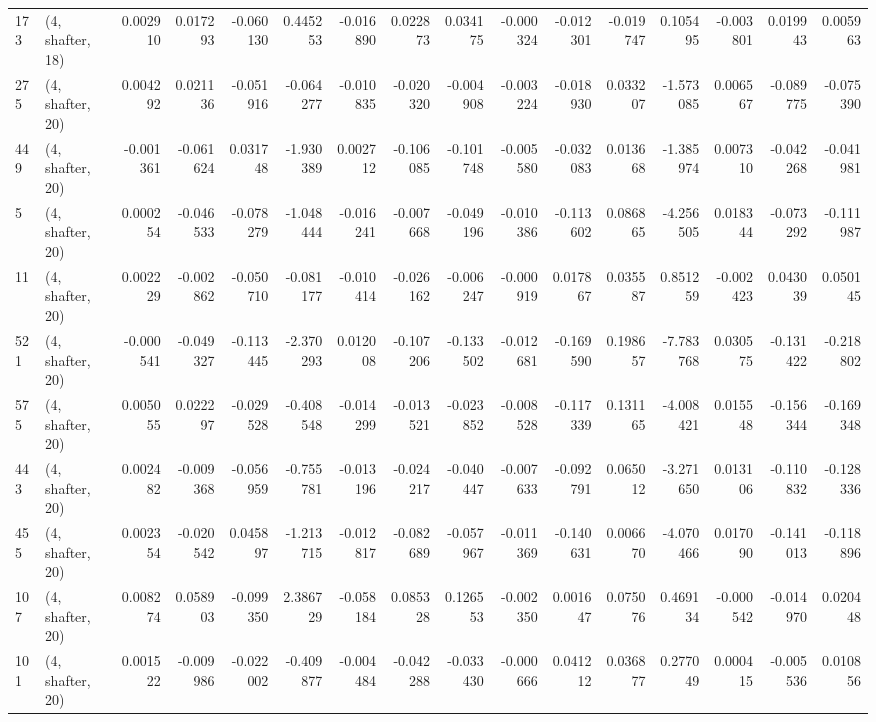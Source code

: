 \begin{tabular}{llrrrrrrrrrrrrrr}
173 &  (4, shafter, 18) &   0.002910 &  0.017293 & -0.060130 &    0.445253 & -0.016890 &   0.022873 &  0.034175 & -0.000324 & -0.012301 & -0.019747 &    0.105495 & -0.003801 &  0.019943 &  0.005963 \\
275 &  (4, shafter, 20) &   0.004292 &  0.021136 & -0.051916 &   -0.064277 & -0.010835 &  -0.020320 & -0.004908 & -0.003224 & -0.018930 &  0.033207 &   -1.573085 &  0.006567 & -0.089775 & -0.075390 \\
449 &  (4, shafter, 20) &  -0.001361 & -0.061624 &  0.031748 &   -1.930389 &  0.002712 &  -0.106085 & -0.101748 & -0.005580 & -0.032083 &  0.013668 &   -1.385974 &  0.007310 & -0.042268 & -0.041981 \\
5   &  (4, shafter, 20) &   0.000254 & -0.046533 & -0.078279 &   -1.048444 & -0.016241 &  -0.007668 & -0.049196 & -0.010386 & -0.113602 &  0.086865 &   -4.256505 &  0.018344 & -0.073292 & -0.111987 \\
11  &  (4, shafter, 20) &   0.002229 & -0.002862 & -0.050710 &   -0.081177 & -0.010414 &  -0.026162 & -0.006247 & -0.000919 &  0.017867 &  0.035587 &    0.851259 & -0.002423 &  0.043039 &  0.050145 \\
521 &  (4, shafter, 20) &  -0.000541 & -0.049327 & -0.113445 &   -2.370293 &  0.012008 &  -0.107206 & -0.133502 & -0.012681 & -0.169590 &  0.198657 &   -7.783768 &  0.030575 & -0.131422 & -0.218802 \\
575 &  (4, shafter, 20) &   0.005055 &  0.022297 & -0.029528 &   -0.408548 & -0.014299 &  -0.013521 & -0.023852 & -0.008528 & -0.117339 &  0.131165 &   -4.008421 &  0.015548 & -0.156344 & -0.169348 \\
443 &  (4, shafter, 20) &   0.002482 & -0.009368 & -0.056959 &   -0.755781 & -0.013196 &  -0.024217 & -0.040447 & -0.007633 & -0.092791 &  0.065012 &   -3.271650 &  0.013106 & -0.110832 & -0.128336 \\
455 &  (4, shafter, 20) &   0.002354 & -0.020542 &  0.045897 &   -1.213715 & -0.012817 &  -0.082689 & -0.057967 & -0.011369 & -0.140631 &  0.006670 &   -4.070466 &  0.017090 & -0.141013 & -0.118896 \\
107 &  (4, shafter, 20) &   0.008274 &  0.058903 & -0.099350 &    2.386729 & -0.058184 &   0.085328 &  0.126553 & -0.002350 &  0.001647 &  0.075076 &    0.469134 & -0.000542 & -0.014970 &  0.020448 \\
101 &  (4, shafter, 20) &   0.001522 & -0.009986 & -0.022002 &   -0.409877 & -0.004484 &  -0.042288 & -0.033430 & -0.000666 &  0.041212 &  0.036877 &    0.277049 &  0.000415 & -0.005536 &  0.010856 \\

\end{tabular}
